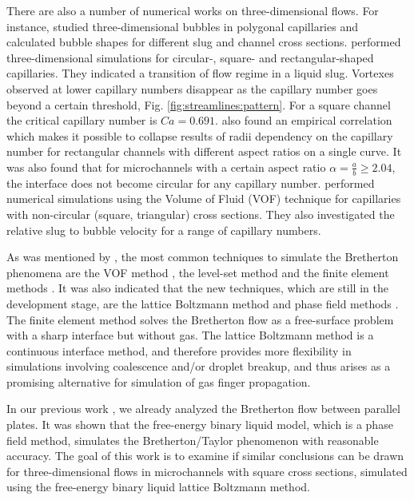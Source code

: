 \documentclass[preprint,12pt]{elsarticle}
\begin{document}
There are also a number of numerical works on three-dimensional flows. For instance, 
\citet{wong-films,wong-pressure} studied
three-dimensional bubbles in
polygonal capillaries and calculated bubble shapes for different
slug and channel cross sections.
\citet{heil-threedim} performed three-dimensional simulations for circular-,
square- and rectangular-shaped capillaries. They indicated a transition of flow regime in a liquid
slug. Vortexes observed at lower capillary numbers disappear as the capillary number goes beyond a
certain threshold,  Fig. \ref{fig:streamlines:pattern}. For a square channel the critical
capillary number is $Ca=0.691$.  \citet{heil-threedim} also found an empirical
correlation which
makes it possible to collapse results of radii dependency on the capillary number
for rectangular channels with different aspect ratios on a single curve.
It was also found that for microchannels with a certain aspect ratio $\alpha=\frac{a}{b}\geq
2.04$, the interface does not become
circular for any capillary number. \citet{wang-non-circular} performed numerical
simulations using the Volume of Fluid (VOF) technique for
capillaries with non-circular (square, triangular) cross sections. They also investigated the
relative slug to bubble velocity for
a range of capillary numbers. 

As was mentioned by \citet{gupta-review}, the most common techniques to simulate the Bretherton
phenomena are the VOF method \cite{wang-non-circular}, the level-set method
\cite{fukugata-levelset} and the finite element methods \cite{kreutzer-taylor,heil-threedim}. It was
also indicated \cite{gupta-review} that the new techniques, which are still in the development
stage,
are the lattice Boltzmann method and phase field methods \cite{anderson-diffuse,gurtin-binary}.
The finite element method solves the Bretherton flow as a free-surface problem with a sharp
interface but without gas.  The lattice Boltzmann method is a continuous
interface method, and therefore provides more flexibility in simulations involving coalescence
and/or
droplet breakup, and thus arises as a promising alternative for simulation of gas finger propagation. 

In our previous work \cite{kuzmin-binary2d}, we already analyzed the Bretherton flow between
parallel
plates.
It was shown that the free-energy binary liquid model, which is a phase field method, simulates the
Bretherton/Taylor phenomenon with reasonable accuracy. The goal of this work is to examine 
if similar conclusions can be drawn for three-dimensional flows in microchannels with square cross
sections,
simulated using the free-energy binary liquid lattice Boltzmann
method. 
\end{document}
